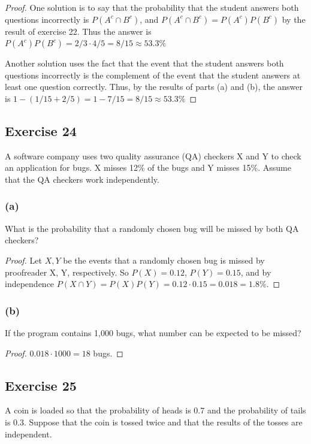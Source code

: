 \documentclass[14pt]{extarticle}
\begin{document}
\begin{proof}
     One solution is to say that the probability that the student answers both questions incorrectly is \(P(A^c \cap B^c)\), and
     \(P(A^c \cap B^c) = P(A^c)P(B^c)\) by the result of exercise 22. Thus the answer is \(P(A^c)P(B^c) = 2/3 \cdot 4/5 = 8/15
     \approx 53.3\%\)

     Another solution uses the fact that the event that the student answers both questions incorrectly is the complement of the
     event that the student answers at least one question correctly. Thus, by the results of parts (a) and (b), the
     answer is \(1-(1/15+2/5) = 1-7/15 = 8/15 \approx 53.3\%\)
\end{proof}

\subsection{Exercise 24}
A software company uses two quality assurance (QA) checkers X and Y to check an application for bugs. X misses 12\% of the bugs and Y misses 15\%. Assume that the QA checkers work independently.

\subsubsection{(a)}
What is the probability that a randomly chosen bug will be missed by both QA checkers?

\begin{proof}
     Let \(X, Y\) be the events that a randomly chosen bug is missed by proofreader X, Y, respectively. So \(P(X) = 0.12\),
     \(P(Y) = 0.15\), and by independence \(P(X \cap Y) = P(X)P(Y) = 0.12 \cdot 0.15 = 0.018 = 1.8\%\).
\end{proof}

\subsubsection{(b)}
If the program contains 1,000 bugs, what number can be expected to be missed?

\begin{proof}
     \(0.018 \cdot 1000 = 18\) bugs.
\end{proof}

\subsection{Exercise 25}
A coin is loaded so that the probability of heads is 0.7 and the probability of tails is 0.3. Suppose that the coin is
tossed twice and that the results of the tosses are independent.
\end{document}
